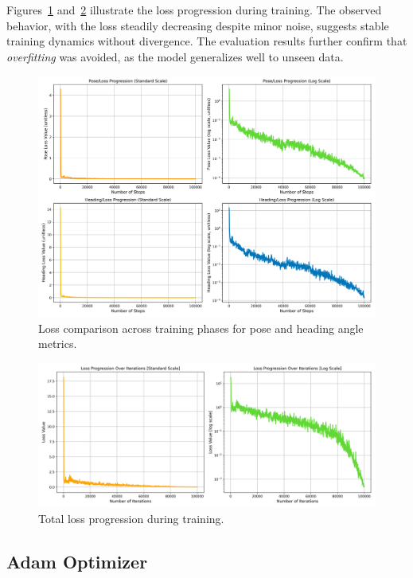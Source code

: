 Figures~\ref{fig:loss_comparison_2} and~\ref{fig:total_loss_2} illustrate the loss progression during training. The observed behavior, with the loss steadily decreasing despite minor noise, suggests stable training dynamics without divergence. The evaluation results further confirm that \textit{overfitting} was avoided, as the model generalizes well to unseen data.
\begin{figure}[H]
    \centering
    \includegraphics[width=1\linewidth]{LateX//figs/BEV1_l1sDEG_pose_heading_loss_comparison.png}
    \caption{Loss comparison across training phases for pose and heading angle metrics.}
    \label{fig:loss_comparison_2}
\end{figure}

\begin{figure}[H]
    \centering
    \includegraphics[width=1\linewidth]{LateX//figs/BEV2_loss_total_l1sDEG_progression_comparison.png}
    \caption{Total loss progression during training.}
    \label{fig:total_loss_2}
\end{figure}

\subsection*{Adam Optimizer}

